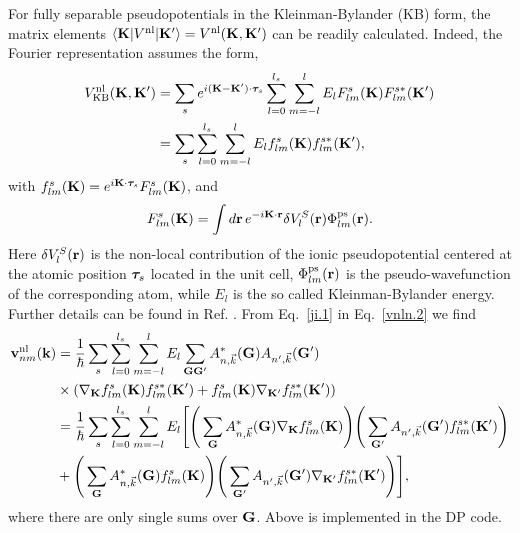 For fully  separable pseudopotentials in the 
Kleinman-Bylander (KB) form,\cite{mottaCMS10,kleinman_efficacious_1982,adolphPRB96}
the
matrix elements 
 $\langle \mathbf{K} |
V^{\mathrm{nl}}
| \mathbf{K}' \rangle
=V^{\mathrm{nl}}(\mathbf{K},\mathbf{K}')
$
can be readily calculated. \cite{mottaCMS10}
Indeed,
the Fourier representation assumes 
the form,\cite{adolphPRB96,gordienkoRPJ04,fuchsCPC99}
\begin{align}\label{ji.1}
V^{\mathrm{nl}}_{\mathrm{KB}}(\mathbf{K},\mathbf{K}')
 &= 
\sum_s e^{i(\mathbf{K}-\mathbf{K}')\cdot\boldsymbol{\tau}_s}
\sum_{l=0}^{l_s}\sum_{m=-l}^{l}E_lF_{lm}^s(\mathbf{K})F_{lm}^{s*}(\mathbf{K}')
\nonumber\\
 &= 
\sum_s 
\sum_{l=0}^{l_s}\sum_{m=-l}^{l}E_lf_{lm}^s(\mathbf{K})f_{lm}^{s*}(\mathbf{K}')
,
\end{align}
with $f^s_{lm}(\mathbf{K})=e^{i\mathbf{K}\cdot\boldsymbol{\tau}_s}F^s_{lm}(\mathbf{K})$, and
\begin{align}\label{ji.2}
F^s_{lm}(\mathbf{K})=\int d\mathbf{r}\,e^{-i\mathbf{K}\cdot\mathbf{r}}
\delta V^S_l(\mathbf{r})
\Phi^{\mathrm{ps}}_{lm}(\mathbf{r}) 
.
\end{align}
Here $\delta V^S_l(\mathbf{r})$ is the non-local contribution of the ionic
pseudopotential centered at the atomic position $\boldsymbol{\tau}_s$ located in
the unit cell, 
$\Phi^{\mathrm{ps}}_{lm}(\mathbf{r})$ is the pseudo-wavefunction of the corresponding
atom, while $E_l$ is the so called 
Kleinman-Bylander energy. Further details can be found in
Ref. .
From Eq.~\eqref{ji.1} in Eq.~\eqref{vnln.2} we find
\begin{align}
\mathbf{v}^{\mathrm{nl}}_{nm}(\mathbf{k})
&=
\frac{1}{\hbar}
\sum_s
\sum_{l=0}^{l_s}\sum_{m=-l}^{l}E_l \sum_{\mathbf{G}\mathbf{G}'}
A^*_{n,\vec{k}}(\mathbf{G})A_{n',\vec{k}}(\mathbf{G}')
\nonumber\\
&\times
( \nabla_{\mathbf{K}}f_{lm}^s(\mathbf{K})f_{lm}^{s*}(\mathbf{K}') +
f_{lm}^s(\mathbf{K})\nabla_{\mathbf{K}'}f_{lm}^{s*}(\mathbf{K}') ) \nonumber\\
&
=\frac{1}{\hbar}
 \sum_s \sum_{l=0}^{l_s}\sum_{m=-l}^{l}E_l \Bigg[
\Bigg(\sum_{\mathbf{G}}A^*_{n,\vec{k}}(\mathbf{G})\nabla_{\mathbf{K}}f_{lm}^s(\mathbf{K})\Bigg)
\Bigg(\sum_{\mathbf{G}'}A_{n',\vec{k}}(\mathbf{G}')
f_{lm}^{s*}(\mathbf{K}')\Bigg) \nonumber\\
&+
\Bigg(\sum_{\mathbf{G}}A^*_{n,\vec{k}}(\mathbf{G})
f_{lm}^s(\mathbf{K})\Bigg)\Bigg
(\sum_{\mathbf{G}'}A_{n',\vec{k}}(\mathbf{G}')
\nabla_{\mathbf{K}'}f_{lm}^{s*}(\mathbf{K}')\Bigg) \Bigg]
,
\end{align}
where there are only single sums over $\mathbf{G}$. Above is implemented in
the DP code.\cite{francesco}
